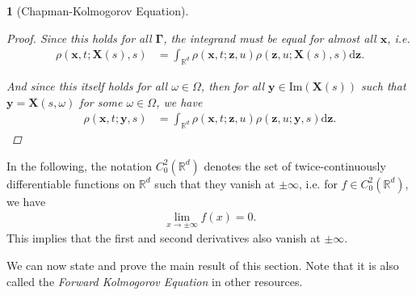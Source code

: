 \documentclass[english]{article}
\numberwithin{equation}{section}
\numberwithin{figure}{section}
\theoremstyle{bolddescit}
\newtheorem{theorem}{\protect\theoremname}[section]
\theoremstyle{definition}
\theoremstyle{definition}
\theoremstyle{plain}
\theoremstyle{plain}
\theoremstyle{bolddesc}
\theoremstyle{plain}
\theoremstyle{remark}
\providecommand{\theoremname}{Theorem}
\begin{document}
\begin{theorem}[Chapman-Kolmogorov Equation]
\begin{proof}
    Since this holds for all $\mathbf{\Gamma}$, the integrand must be equal for almost all $\mathbf{x}$, i.e.
    \begin{align*}
      \rho(\mathbf{x},t;\mathbf{X}(s),s)
      &= \int_{\mathbb{R}^d} \rho(\mathbf{x},t;\mathbf{z},u) \rho(\mathbf{z},u;\mathbf{X}(s),s) \mathrm{d}\mathbf{z}.
    \end{align*}

    And since this itself holds for all $\omega \in \Omega$, then for all $\mathbf{y} \in \mathrm{Im}(\mathbf{X}(s))$ such that $\mathbf{y} = \mathbf{X}(s,\omega)$ for some $\omega \in \Omega$, we have
    \begin{align*}
      \rho(\mathbf{x},t;\mathbf{y},s)
      &= \int_{\mathbb{R}^d} \rho(\mathbf{x},t;\mathbf{z},u) \rho(\mathbf{z},u;\mathbf{y},s) \mathrm{d}\mathbf{z}.
    \end{align*}
  \end{proof}
\end{theorem}

In the following, the notation $C^2_0(\mathbb{R}^d)$ denotes the set of twice-continuously differentiable functions on $\mathbb{R}^d$ such that they vanish at $\pm \infty$, i.e. for $f \in C^2_0(\mathbb{R}^d)$, we have
\begin{align*}
  \lim_{x \to \pm \infty} f(x) = 0.
\end{align*}
This implies that the first and second derivatives also vanish at $\pm \infty$.

We can now state and prove the main result of this section. Note that it is also called the \textit{Forward Kolmogorov Equation} in other resources.
\end{document}
